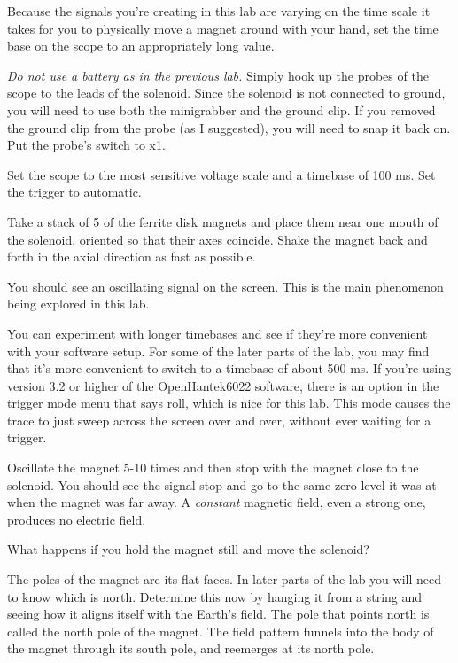 Because the signals you're creating in this lab are varying on the time scale
it takes for you to physically move a magnet around with your hand, set the
time base on the scope to an appropriately long value.


\emph{Do not use a battery as in the previous lab.} Simply hook up
the probes of the scope to the leads of the solenoid. Since the solenoid
is not connected to ground, you will need to use both the minigrabber and
the ground clip. If you removed the ground clip from the probe (as I suggested),
you will need to snap it back on. Put the probe's switch to x1.

Set the scope to the most sensitive voltage scale and a timebase of 100 ms.
Set the trigger to automatic.

Take a stack of 5 of the ferrite disk magnets and place them near one
mouth of the solenoid, oriented so that their axes coincide. Shake the
magnet back and forth in the axial direction as fast as possible.

You should see an oscillating signal on the screen. This is the main phenomenon
being explored in this lab.

You can experiment with longer timebases and see if they're more convenient with
your software setup. For some of the later parts of the lab, you may find that it's
more convenient to switch to a timebase of about 500 ms. 
If you're using version 3.2 or higher of the OpenHantek6022 software, 
there is an option in the trigger mode menu that says roll, which is nice for this
lab. This mode causes the trace to just sweep across
the screen over	and over, without ever waiting for a trigger.


Oscillate the magnet 5-10 times and then stop with the magnet close to the solenoid.
You should see the signal stop and go to the same zero level it was at when the
magnet was far away. A \emph{constant} magnetic field, even a strong one, produces no
electric field.


What happens if you hold the magnet still and move the solenoid? 

The poles of the magnet are its flat faces. In later parts
of the lab you will need to know which is north. Determine
this now by hanging it from a string and seeing how it aligns itself with the Earth's field.
The pole that points north is called the north pole of the
magnet. The field pattern funnels into the body of the magnet
through its south pole, and reemerges at its north pole.

